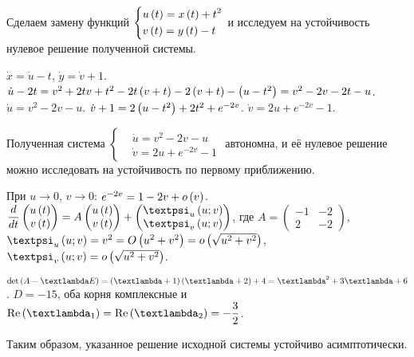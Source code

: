 \documentclass[a5paper,10pt]{article}
\begin{document}
Сделаем замену функций
$\left\{ \begin{aligned}& u\left(t\right) = x\left(t\right) + t^2 \\& v\left(t\right) = y\left(t\right) - t \end{aligned}\right.$ и исследуем на устойчивость нулевое решение полученной системы.

$\dot{x} = \dot{u} - t$, $\dot{y} = \dot{v} + 1$.
$\dot{u} - 2t
= v^2 + 2tv + t^2 - 2t\left(v + t\right) - 2\left(v + t\right) - \left(u - t^2\right)
= v^2 - 2v - 2t - u$.
$\dot{u} = v^2 - 2v - u$.
$\dot{v} + 1 = 2\left(u - t^2\right) + 2t^2 + e^{-2v}$.
$\dot{v} = 2u + e^{-2v} - 1$.



Полученная система $\left\{ \begin{aligned}& \dot{u} = v^2 - 2v - u \\& \dot{v} = 2u + e^{-2v} - 1\end{aligned}\right.$ автономна, и её нулевое решение можно исследовать на устойчивость по первому приближению.

При $u \to 0$, $v \to 0$:
$e^{-2v} = 1 - 2v + o\left(v\right)$. $\dfrac {d} {dt} \begin{pmatrix} u\br{t} \\ v\br{t} \end{pmatrix} = A \begin{pmatrix} u\br{t} \\ v\br{t} \end{pmatrix} + \begin{pmatrix} \psi_{u}\br{u; v} \\ \psi_{v}\br{u; v} \end{pmatrix}$, где 
$A = \begin{pmatrix} -1 & -2 \\ 2 & -2 \end{pmatrix}$,
$\psi_{u}\br{u; v} = v^2 = O\br{u^2 + v^2} = o\br{\sqrt{u^2 + v^2}}$,
$\psi_{v}\br{u; v} = o\br{\sqrt{u^2 + v^2}}$.

$\det\br{A - \lambda E} = \br{\lambda + 1}\br{\lambda + 2} + 4 = \lambda^2 + 3\lambda + 6$. $D = -15$, оба корня комплексные и $\Re\br{\lambda_{1}} = \Re\br{\lambda_{2}} = -\dfrac {3} {2}$. 

Таким образом, указанное решение исходной системы устойчиво асимптотически.
\end{document}
